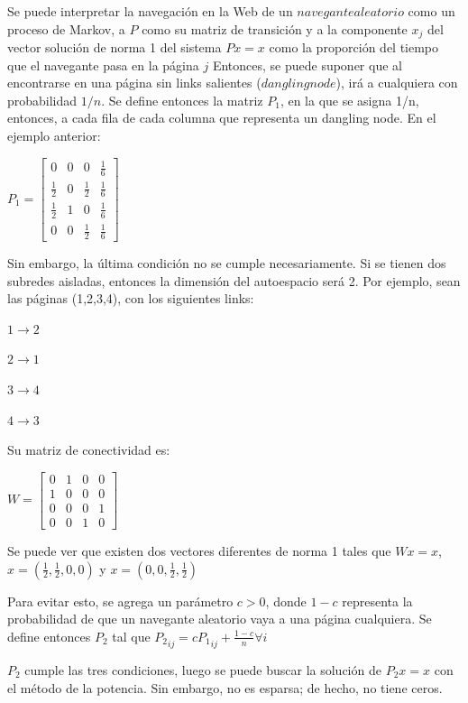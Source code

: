 \documentclass[a4paper]{article}
\begin{document}
Se puede interpretar la navegación en la Web de un $navegante aleatorio$ como un proceso de Markov, a $P$ como su matriz de transición y a la componente $x_j$ del vector soluci\'on de norma 1 del sistema $Px = x$ como la proporci\'on del tiempo que el navegante pasa en la p\'agina $j$ Entonces, se puede suponer que al encontrarse en una página sin links salientes ($dangling node$), irá a cualquiera con probabilidad $1/n$. Se define entonces la matriz $P_1$, en la que se asigna 1/n, entonces, a cada fila de cada columna que representa un dangling node. En el ejemplo anterior:
\begin{center}
$P_1= \begin{bmatrix} 0&0&0&\frac{1}{6}\\\frac{1}{2}&0&\frac{1}{2}&\frac{1}{6}\\\frac{1}{2}&1&0&\frac{1}{6}\\0&0&\frac{1}{2}&\frac{1}{6} \end{bmatrix} $
\end{center}

Sin embargo, la última condición no se cumple necesariamente. Si se tienen dos subredes aisladas, entonces la dimensión del autoespacio será 2. Por ejemplo, sean las páginas (1,2,3,4), con los siguientes links: 

$1 \rightarrow 2$

$2 \rightarrow 1$

$3 \rightarrow 4$

$4 \rightarrow 3$

Su matriz de conectividad es:
\begin{center}
$W=\begin{bmatrix} 0&1&0&0\\1&0&0&0\\ 0&0&0&1\\0&0&1&0\end{bmatrix}$
\end{center}
Se puede ver que existen dos vectores diferentes de norma 1 tales que $Wx=x$, $x=\left( \frac{1}{2}, \frac{1}{2},0 ,0\right)$ y $x=\left(0,0,\frac{1}{2}, \frac{1}{2} \right)$ 

Para evitar esto, se agrega un parámetro $c>0$, donde $1-c$ representa la probabilidad de que un navegante aleatorio vaya a una página cualquiera. Se define entonces $P_2$ tal que
${P_2}_{ij} = c{P_1}_{ij} + \frac{1-c}{n}  \forall i$

$P_2$ cumple las tres condiciones, luego se puede buscar la solución de $P_2x=x$ con el método de la potencia. Sin embargo, no es esparsa; de hecho, no tiene ceros.
\end{document}
